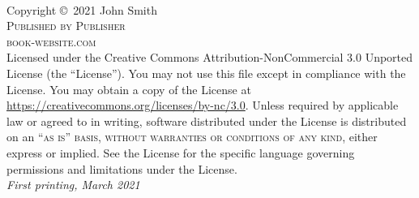 \documentclass[a4paper,12pt]{book}
\begin{document}
    \newpage
    \thispagestyle{empty}
    ~\vfill

    \noindent Copyright \copyright\ 2021 John Smith\\ %

    \noindent \textsc{Published by Publisher}\\ %

    \noindent \textsc{book-website.com}\\ %

    \noindent Licensed under the Creative Commons Attribution-NonCommercial 3.0 Unported License
    (the ``License'').
    You may not use this file except in compliance with the License.
    You may obtain a copy of the License at \url{https://creativecommons.org/licenses/by-nc/3.0}.
    Unless required by applicable law or agreed to in writing, software distributed under the
    License is distributed on an \textsc{``as is'' basis, without warranties or conditions of any
    kind}, either express or implied.
    See the License for the specific language governing permissions and limitations under the
    License.\\ %

    \noindent \textit{First printing, March 2021} %

    \pagestyle{empty} %

    \dominitoc %
    \tableofcontents %



    \pagestyle{fancy} %

    

    
\end{document}
